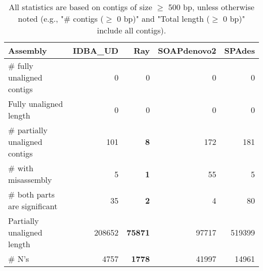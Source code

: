\documentclass[12pt,a4paper]{article}
\begin{document}
\begin{table}[ht]
\begin{center}
\caption{All statistics are based on contigs of size $\geq$ 500 bp, unless otherwise noted (e.g., "\# contigs ($\geq$ 0 bp)" and "Total length ($\geq$ 0 bp)" include all contigs).}
\begin{tabular}{|l*{4}{|r}|}
\hline
Assembly & IDBA\_UD & Ray & SOAPdenovo2 & SPAdes \\ \hline
\# fully unaligned contigs & 0 & 0 & 0 & 0 \\ \hline
Fully unaligned length & 0 & 0 & 0 & 0 \\ \hline
\# partially unaligned contigs & 101 & {\bf 8} & 172 & 181 \\ \hline
\hspace{5mm}\# with misassembly & 5 & {\bf 1} & 55 & 5 \\ \hline
\hspace{5mm}\# both parts are significant & 35 & {\bf 2} & 4 & 80 \\ \hline
Partially unaligned length & 208652 & {\bf 75871} & 97717 & 519399 \\ \hline
\# N's & 4757 & {\bf 1778} & 41997 & 14961 \\ \hline
\end{tabular}
\end{center}
\end{table}
\end{document}
